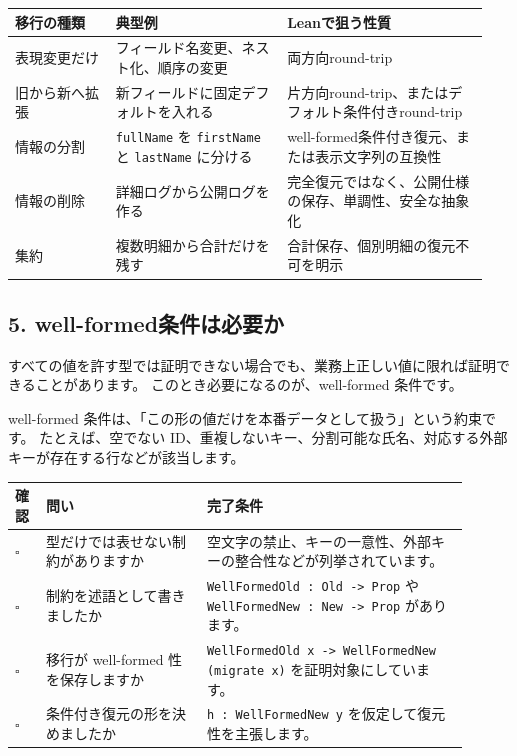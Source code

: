 \begin{longtable}{@{}p{0.20\linewidth}p{0.34\linewidth}p{0.40\linewidth}@{}}
\toprule
移行の種類 & 典型例 & Leanで狙う性質 \\
\midrule
\endhead
表現変更だけ & フィールド名変更、ネスト化、順序の変更 & 両方向round-trip \\
旧から新へ拡張 & 新フィールドに固定デフォルトを入れる & 片方向round-trip、またはデフォルト条件付きround-trip \\
情報の分割 & \texttt{fullName} を \texttt{firstName} と \texttt{lastName} に分ける & well-formed条件付き復元、または表示文字列の互換性 \\
情報の削除 & 詳細ログから公開ログを作る & 完全復元ではなく、公開仕様の保存、単調性、安全な抽象化 \\
集約 & 複数明細から合計だけを残す & 合計保存、個別明細の復元不可を明示 \\
\bottomrule
\end{longtable}

\subsection{5. well-formed条件は必要か}

すべての値を許す型では証明できない場合でも、業務上正しい値に限れば証明できることがあります。
このとき必要になるのが、well-formed 条件です。

well-formed 条件は、「この形の値だけを本番データとして扱う」という約束です。
たとえば、空でない ID、重複しないキー、分割可能な氏名、対応する外部キーが存在する行などが該当します。

\begin{longtable}{@{}p{0.06\linewidth}p{0.32\linewidth}p{0.52\linewidth}@{}}
\toprule
確認 & 問い & 完了条件 \\
\midrule
\endhead
\(\square\) & 型だけでは表せない制約がありますか & 空文字の禁止、キーの一意性、外部キーの整合性などが列挙されています。 \\
\(\square\) & 制約を述語として書きましたか & \texttt{WellFormedOld : Old -> Prop} や \texttt{WellFormedNew : New -> Prop} があります。 \\
\(\square\) & 移行が well-formed 性を保存しますか & \texttt{WellFormedOld x -> WellFormedNew (migrate x)} を証明対象にしています。 \\
\(\square\) & 条件付き復元の形を決めましたか & \texttt{h : WellFormedNew y} を仮定して復元性を主張します。 \\
\bottomrule
\end{longtable}


